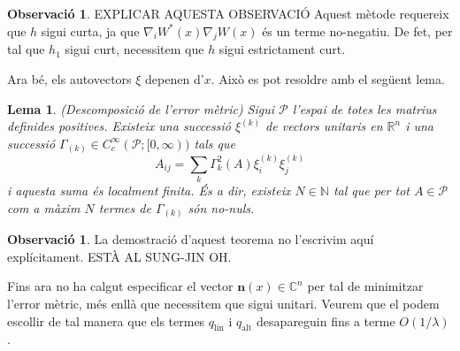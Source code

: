 \documentclass[11pt,a4paper,openright,oneside]{book}
\numberwithin{equation}{section}
\newtheorem{lema}[teo]{Lema}
\theoremstyle{definition}
\newtheorem{obs}[teo]{Observaci\'o}
\begin{document}
\begin{obs}
    {\color{blue} EXPLICAR AQUESTA OBSERVACIÓ}
    Aquest mètode requereix que $h$ sigui curta, ja que $\nabla_i W^*(x) \nabla_jW(x)$ és un terme no-negatiu. De fet, per tal que $h_1$ sigui curt, necessitem que $h$ sigui estrictament curt.
\end{obs}
Ara bé, els autovectors $\xi$ depenen d'$x$. Això es pot resoldre amb el següent lema.
\begin{lema}\label{lema:descomposicio_error_metric} (Descomposició de l'error mètric)
    Sigui $\mathcal P$ l'espai de totes les matrius definides positives. Existeix una successió $\xi^{(k)}$ de vectors unitaris en $\mathbb R^n$ i una successió $\Gamma_{(k)}\in C_c^\infty(\mathcal P; [0,\infty))$ tals que
    \begin{equation*}
        A_{ij} = \sum_k\Gamma^2_{k}(A)\xi_i^{(k)}\xi_j^{(k)}
    \end{equation*}
    i aquesta suma és \textit{localment finita}. És a dir, existeix $N\in\mathbb N$ tal que per tot $A\in\mathcal P$ com a màxim $N$ termes de $\Gamma_{(k)}$ són no-nuls.
\end{lema}
\begin{obs}
    La demostració d'aquest teorema no l'escrivim aquí explícitament. {\color{blue} ESTÀ AL SUNG-JIN OH.}
\end{obs}
Fins ara no ha calgut especificar el vector $\textbf{n}(x)\in\mathbb C^n$ per tal de minimitzar l'error mètric, més enllà que necessitem que sigui unitari. Veurem que el podem escollir de tal manera que els termes $q_{\text{lin}}$ i $q_{\text{alt}}$ desapareguin fins a terme $O(1/\lambda)$.
\end{document}
